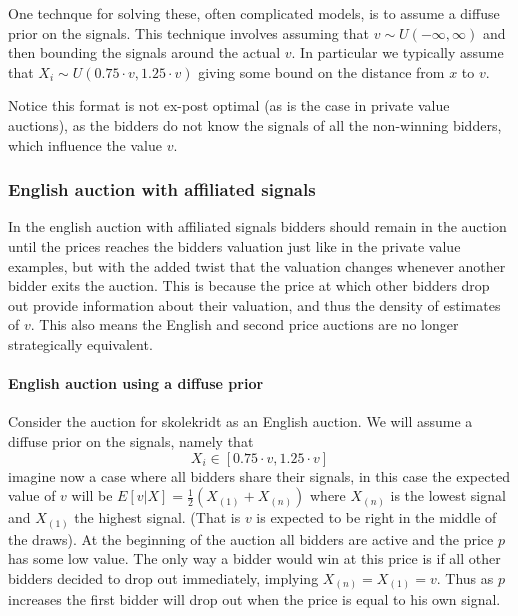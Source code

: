 One technque for solving these, often complicated models, is to assume a diffuse prior on the signals. This technique involves assuming that $v\sim U(-\infty, \infty)$ and then bounding the signals around the actual $v$. In particular we typically assume that $X_i \sim U(0.75\cdot v, 1.25\cdot v)$ giving some bound on the distance from $x$ to $v$.

Notice this format is not ex-post optimal (as is the case in private value auctions), as the bidders do not know the signals of all the non-winning bidders, which influence the value $v$.

\subsubsection{English auction with affiliated signals}
In the english auction with affiliated signals bidders should remain in the auction until the prices reaches the bidders valuation just like in the private value examples, but with the added twist that the valuation changes whenever another bidder exits the auction. This is because the price at which other bidders drop out provide information about their valuation, and thus the density of estimates of $v$. This also means the English and second price auctions are no longer strategically equivalent. 

\paragraph{English auction using a diffuse prior} Consider the auction for skolekridt as an English auction. We will assume a diffuse prior on the signals, namely that 
\begin{equation}
  X_i \in [0.75 \cdot v, 1.25\cdot v]
\end{equation}
imagine now a case where all bidders share their signals, in this case the expected value of $v$ will be $E[v|X] = \frac{1}{2}(X_{(1)} + X_{(n)})$ where $X_{(n)}$ is the lowest signal and $X_{(1)}$ the highest signal. (That is $v$ is expected to be right in the middle of the draws). At the beginning of the auction all bidders are active and the price $p$ has some low value. The only way a bidder would win at this price is if all other bidders decided to drop out immediately, implying $X_{(n)}=X_{(1)}=v$. Thus as $p$ increases the first bidder will drop out when the price is equal to his own signal.

